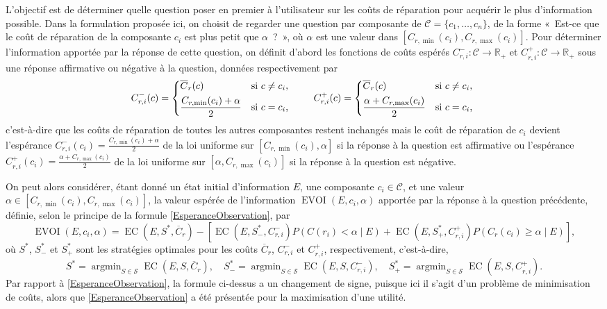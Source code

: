 \documentclass[a4paper,11pt]{article}
\theoremstyle{plain}
\theoremstyle{definition}
\DeclareMathOperator*{\argmin}{argmin}
\DeclareMathOperator{\EC}{EC}
\DeclareMathOperator{\EVOI}{EVOI}
\begin{document}
L'objectif est de déterminer quelle question poser en premier à l'utilisateur sur les coûts de réparation pour acquérir le plus d'information possible. Dans la formulation proposée ici, on choisit de regarder une question par composante de $\mathcal C = \{c_1, \dotsc, c_n\}$, de la forme «~Est-ce que le coût de réparation de la composante $c_i$ est plus petit que $\alpha$~?~», où $\alpha$ est une valeur dans $[C_{r, \min}(c_i), C_{r, \max}(c_i)]$. Pour déterminer l'information apportée par la réponse de cette question, on définit d'abord les fonctions de coûts espérés $C_{r, i}^-: \mathcal C \to \mathbb R_+$ et $C_{r, i}^+: \mathcal C \to \mathbb R_+$ sous une réponse affirmative ou négative à la question, données respectivement par
\begin{equation}
\label{EqDefiCpm}
C_{r, i}^-(c) = \begin{dcases*}
\overline C_r(c) & si $c \neq c_i$, \\
\frac{C_{r, \min}(c_i) + \alpha}{2} & si $c = c_i$,
\end{dcases*} \qquad C_{r, i}^+(c) = \begin{dcases*}
\overline C_r(c) & si $c \neq c_i$, \\
\frac{\alpha + C_{r, \max}(c_i)}{2} & si $c = c_i$,
\end{dcases*}
\end{equation}
c'est-à-dire que les coûts de réparation de toutes les autres composantes restent inchangés mais le coût de réparation de $c_i$ devient l'espérance $C_{r, i}^-(c_i) = \frac{C_{r, \min}(c_i) + \alpha}{2}$ de la loi uniforme sur $[C_{r, \min}(c_i), \alpha]$ si la réponse à la question est affirmative ou l'espérance $C_{r, i}^+(c_i) = \frac{\alpha + C_{r, \max}(c_i)}{2}$ de la loi uniforme sur $[\alpha, C_{r, \max}(c_i)]$ si la réponse à la question est négative.

On peut alors considérer, étant donné un état initial d'information $E$, une composante $c_i \in \mathcal C$, et une valeur $\alpha \in [C_{r, \min}(c_i), C_{r, \max}(c_i)]$, la valeur espérée de l'information $\EVOI(E, c_i, \alpha)$ apportée par la réponse à la question précédente, définie, selon le principe de la formule \eqref{EsperanceObservation}, par
\begin{equation}
\label{EqDefiEVOI}
\EVOI(E, c_i, \alpha) = \EC(E, S^\ast, \overline C_r) - \left[\EC(E, S_-^\ast, C_{r, i}^-) P(C(r_i) < \alpha \mid E) + \EC(E, S_+^\ast, C_{r, i}^+) P(C_r(c_i) \geq \alpha \mid E)\right],
\end{equation}
où $S^\ast$, $S_-^\ast$ et $S_+^\ast$ sont les stratégies optimales pour les coûts $\overline C_r$, $C_{r, i}^-$ et $C_{r, i}^+$, respectivement, c'est-à-dire,
\begin{equation}
\label{EqSAsts}
S^\ast = \argmin_{S \in \mathcal S} \EC(E, S, \overline C_r), \quad S_-^\ast = \argmin_{S \in \mathcal S} \EC(E, S, C_{r, i}^-), \quad S_+^\ast = \argmin_{S \in \mathcal S} \EC(E, S, C_{r, i}^+).
\end{equation}
Par rapport à \eqref{EsperanceObservation}, la formule ci-dessus a un changement de signe, puisque ici il s'agit d'un problème de minimisation de coûts, alors que \eqref{EsperanceObservation} a été présentée pour la maximisation d'une utilité.
\end{document}
